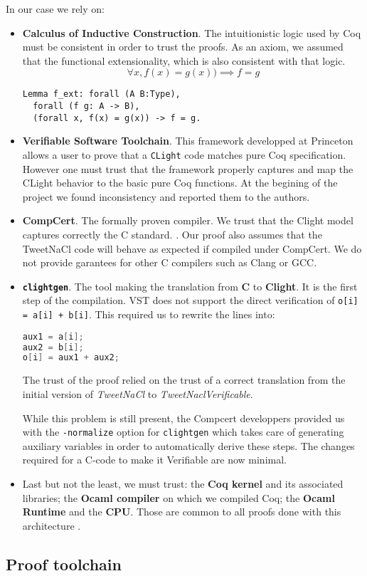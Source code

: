 In our case we rely on:
\begin{itemize}
  \item \textbf{Calculus of Inductive Construction}. The intuitionistic logic
  used by Coq must be consistent in order to trust the proofs. As an axiom,
  we assumed that the functional extensionality, which is also consistent with that logic.
  $$\forall x, f(x) = g(x) ) \implies f = g$$
\begin{lstlisting}[language=Coq]
Lemma f_ext: forall (A B:Type),
  forall (f g: A -> B),
  (forall x, f(x) = g(x)) -> f = g.
\end{lstlisting}

  \item \textbf{Verifiable Software Toolchain}. This framework developped at
  Princeton allows a user to prove that a \texttt{CLight} code matches pure Coq
  specification. However one must trust that the framework properly captures and
  map the CLight behavior to the basic pure Coq functions. At the begining of
  the project we found inconsistency and reported them to the authors.

  \item \textbf{CompCert}. The formally proven compiler. We trust that the Clight
  model captures correctly the C standard.
  .
  Our proof also assumes that the TweetNaCl code will behave as expected if
  compiled under CompCert. We do not provide garantees for other C compilers
  such as Clang or GCC.

  \item \textbf{\texttt{clightgen}}. The tool making the translation from \textbf{C} to
  \textbf{Clight}. It is the first step of the compilation.
  VST does not support the direct verification of \texttt{o[i] = a[i] + b[i]}.
  This required us to rewrite the lines into:
\begin{lstlisting}[language=C]
aux1 = a[i];
aux2 = b[i];
o[i] = aux1 + aux2;
\end{lstlisting}
  The trust of the proof relied on the trust of a correct translation from the
  initial version of \textit{TweetNaCl} to \textit{TweetNaclVerificable}.

  While this problem is still present, the Compcert developpers provided us with
  the \texttt{-normalize} option for \texttt{clightgen} which takes care of
  generating auxiliary variables in order to automatically derive these steps.
  The changes required for a C-code to make it Verifiable are now minimal.

  \item Last but not the least, we must trust: the \textbf{Coq kernel} and its
  associated libraries; the \textbf{Ocaml compiler} on which we compiled Coq;
  the \textbf{Ocaml Runtime} and the \textbf{CPU}. Those are common to all proofs
  done with this architecture \cite{2015-Appel,coq-faq}.
\end{itemize}

\subsection{Proof toolchain}
